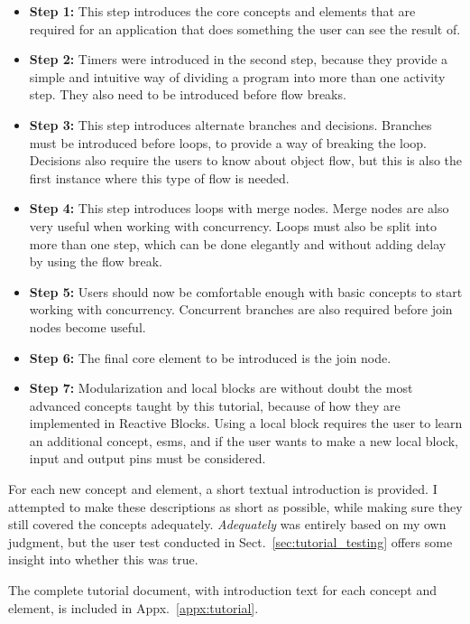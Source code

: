 \begin{itemize}
	\item{\textbf{Step 1:}} This step introduces the core concepts and elements that are required for an application that does something the user can see the result of.
	\item{\textbf{Step 2:}} Timers were introduced in the second step, because they provide a simple and intuitive way of dividing a program into more than one activity step. They also need to be introduced before flow breaks.
	\item{\textbf{Step 3:}} This step introduces alternate branches and decisions. Branches must be introduced before loops, to provide a way of breaking the loop. Decisions also require the users to know about object flow, but this is also the first instance where this type of flow is needed.
	\item{\textbf{Step 4:}} This step introduces loops with merge nodes. Merge nodes are also very useful when working with concurrency. Loops must also be split into more than one step, which can be done elegantly and without adding delay by using the flow break.
	\item{\textbf{Step 5:}} Users should now be comfortable enough with basic concepts to start working with concurrency. Concurrent branches are also required before join nodes become useful.
	\item{\textbf{Step 6:}} The final core element to be introduced is the join node.
	\item{\textbf{Step 7:}} Modularization and local blocks are without doubt the most advanced concepts taught by this tutorial, because of how they are implemented in Reactive Blocks. Using a local block requires the user to learn an additional concept, \glspl{esm}, and if the user wants to make a new local block, input and output pins must be considered.
\end{itemize}

\noindent
For each new concept and element, a short textual introduction is provided. I attempted to make these descriptions as short as possible, while making sure they still covered the concepts adequately. \emph{Adequately} was entirely based on my own judgment, but the user test conducted in Sect.~\ref{sec:tutorial_testing} offers some insight into whether this was true.

\noindent
The complete tutorial document, with introduction text for each concept and element, is included in Appx.~\ref{appx:tutorial}.

